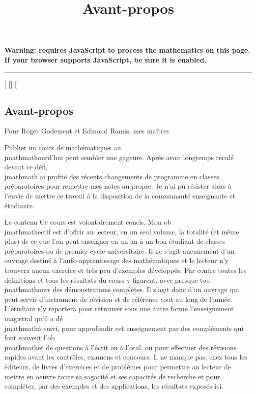 \documentclass[]{article}
\title{Avant-propos}
\author{}
\date{}
\begin{document}
\maketitle

\textbf{Warning: 
requires JavaScript to process the mathematics on this page.\\ If your
browser supports JavaScript, be sure it is enabled.}

\begin{center}\rule{3in}{0.4pt}\end{center}

{[}
{[}{]}
{[}

\subsection{Avant-propos}

Pour Roger Godement et Edmond Ramis, mes maîtres

Publier un cours de mathématiques au\\jmathmathourd'hui peut sembler une gageure.
Après avoir longtemps reculé devant ce défi, \\jmathmath'ai profité des récents
changements de programme en classes préparatoires pour remettre mes
notes au propre. Je n'ai pu résister alors à l'envie de mettre ce
travail à la disposition de la communauté enseignante et étudiante.

Le contenu Ce cours est volontairement concis. Mon ob\\jmathmathectif est d'offrir
au lecteur, en un seul volume, la totalité (et même plus) de ce que l'on
peut enseigner en un an à un bon étudiant de classes préparatoires ou de
premier cycle universitaire. Il ne s'agit aucunement d'un ouvrage
destiné à l'auto-apprentissage des mathématiques et le lecteur n'y
trouvera aucun exercice et très peu d'exemples développés. Par contre
toutes les définitions et tous les résultats du cours y figurent, avec
presque tou\\jmathmathours des démonstrations complètes. Il s'agit donc d'un
ouvrage qui peut servir d'instrument de révision et de référence tout au
long de l'année. L'étudiant s'y reportera pour retrouver sous une autre
forme l'enseignement magistral qu'il a dé\\jmathmathà suivi, pour approfondir cet
enseignement par des compléments qui font souvent l'ob\\jmathmathet de questions à
l'écrit ou à l'oral, ou pour effectuer des révisions rapides avant les
contrôles, examens et concours. Il ne manque pas, chez tous les
éditeurs, de livres d'exercices et de problèmes pour permettre au
lecteur de mettre en oeuvre toute sa sagacité et ses capacités de
recherche et pour compléter, par des exemples et des applications, les
résultats exposés ici.
\end{document}
